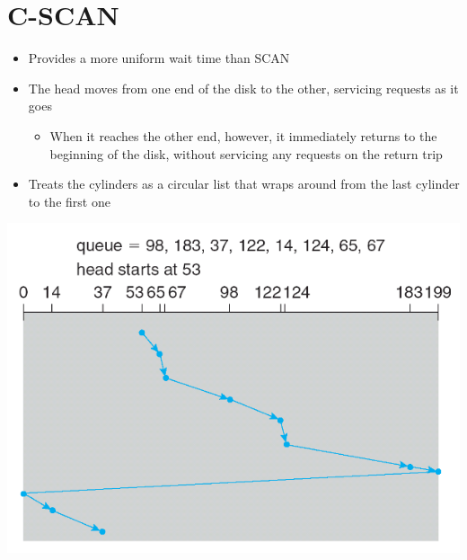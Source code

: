 \documentclass{article}[18pt]
\begin{document}
\section{C-SCAN}
\begin{itemize}
	\item Provides a more uniform wait time than SCAN
	\item The head moves from one end of the disk to the other, servicing requests as it goes
	\begin{itemize}
		\item When it reaches the other end, however, it immediately returns to the beginning of the disk, without servicing any requests on the return trip
	\end{itemize}
	\item Treats the cylinders as a circular list that wraps around from the last cylinder to the first one
\end{itemize}
\begin{center}
	\includegraphics[scale=0.7]{C-Scan}
\end{center}
\end{document}
